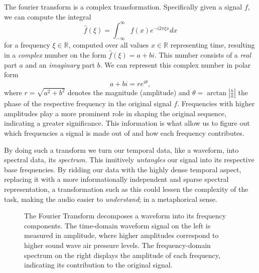 The fourier transform is a complex transformation. Specifically given a signal $f$, we can compute the integral \[ \widehat{f}(\xi) = \int^{\infty}_{-\infty}{f(x)e^{-i2\pi \xi x} dx} \] for a frequency $\xi \in \mathbb{R}$, computed over all values $x \in \mathbb{R}$ representing time, resulting in a \textit{complex} number on the form $\widehat{f}(\xi) = a + bi$. This number consists of a \textit{real} part $a$ and an \textit{imaginary} part $b$. We can represent this complex number in polar form \[ a + bi = re^{i\theta}, \] where $r = \sqrt{a^2 + b^2}$ denotes the magnitude (amplitude) and $\theta = \arctan{|\frac{b}{a}|}$ the phase of the respective frequency in the original signal $f$. Frequencies with higher amplitudes play a more prominent role in shaping the original sequence, indicating a greater significance. This information is what allow us to figure out which frequencies a signal is made out of and how each frequency contributes. 

By doing such a transform we turn our temporal data, like a waveform, into spectral data, its \textit{spectrum}. This inuitively \textit{untangles} our signal into its respective base frequencies. By ridding our data with the highly dense temporal aspect, replacing it with a more informationally independent and sparse spectral representation, a transformation such as this could lessen the complexity of the task, making the audio easier to \textit{understand}; in a metaphorical sense.

\begin{figure}[H]
    \centering
    \hspace*{-1.3cm}
    \caption{The Fourier Transform decomposes a waveform into its frequency components. The time-domain waveform signal on the left is measured in amplitude, where higher amplitudes correspond to higher sound wave air pressure levels. The frequency-domain spectrum on the right displays the amplitude of each frequency, indicating its contribution to the original signal.}
    \label{FTFigure}
\end{figure}

